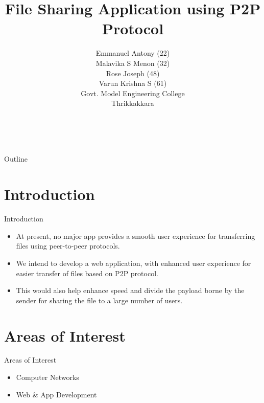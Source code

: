 \documentclass[9pt]{beamer}
\begin{document}
\begin{frame}
\title {\textbf{File Sharing Application using P2P Protocol}\\
}
\author { Emmanuel Antony (22) \\
Malavika S Menon (32)\\
Rose Joseph (48) \\
Varun Krishna S (61)\\ 
\hfill \break
Govt. Model Engineering College\\
 Thrikkakkara }\\
\maketitle
\end{frame}
\begin{frame}[shrink]{Outline}
\tableofcontents
\end{frame}

\section{Introduction}
\begin {frame}[shrink]{Introduction}
\begin{itemize}
\item At present, no major app provides a smooth user experience for transferring files using peer-to-peer protocols. 
\item We intend to develop a web application, with enhanced user experience for easier transfer of files based on P2P protocol.
\item  This would also help enhance speed and divide the payload borne by the sender for sharing the file to a large number of users. 
\end{itemize}
\end{frame}

\section{Areas of Interest}
\begin{frame} {Areas of Interest}

\begin{itemize}
	 \item Computer Networks
     \item Web \& App Development
\end{itemize}
\end {frame}
\end{document}
